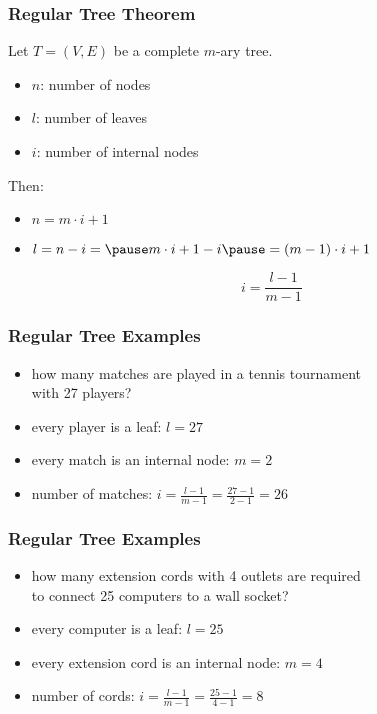 \documentclass[dvipsnames]{beamer}
\begin{document}
\begin{frame}
  \frametitle{Regular Tree Theorem}

  \begin{theorem}
    Let $T=(V,E)$ be a complete $m$-ary tree.

    \begin{itemize}
      \item $n$: number of nodes
      \item $l$: number of leaves
      \item $i$: number of internal nodes
    \end{itemize}

    Then:
    \pause
    \begin{itemize}
      \item $n = m \cdot i + 1$

      \pause
      \item  $l = n - i = \pause m \cdot i + 1 - i
        \pause = (m - 1) \cdot i + 1$

      \pause
      \[
        i = \frac{l - 1}{m - 1}
      \]
    \end{itemize}
  \end{theorem}
\end{frame}

\begin{frame}
  \frametitle{Regular Tree Examples}

  \begin{example}
    \begin{itemize}
      \item how many matches are played in a tennis tournament\\
        with 27 players?

      \pause
      \bigskip
      \item every player is a leaf: $l = 27$
      \item every match is an internal node: $m = 2$
      \item number of matches: $i = \frac{l - 1}{m - 1} = \frac{27 - 1}{2 - 1} = 26$
    \end{itemize}
  \end{example}
\end{frame}

\begin{frame}
  \frametitle{Regular Tree Examples}

  \begin{example}
    \begin{itemize}
      \item how many extension cords with 4 outlets are required\\
        to connect 25 computers to a wall socket?

      \pause
      \bigskip
      \item every computer is a leaf: $l = 25$
      \item every extension cord is an internal node: $m = 4$
      \item number of cords: $i = \frac{l - 1}{m - 1} = \frac{25 - 1}{4 - 1} = 8$
    \end{itemize}
  \end{example}
\end{frame}
\end{document}

